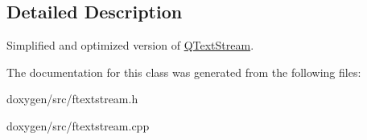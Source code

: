 \subsection{Detailed Description}
Simplified and optimized version of \mbox{\hyperlink{class_q_text_stream}{Q\+Text\+Stream}}. 

The documentation for this class was generated from the following files\+:\begin{DoxyCompactItemize}
\item 
doxygen/src/ftextstream.\+h\item 
doxygen/src/ftextstream.\+cpp\end{DoxyCompactItemize}
